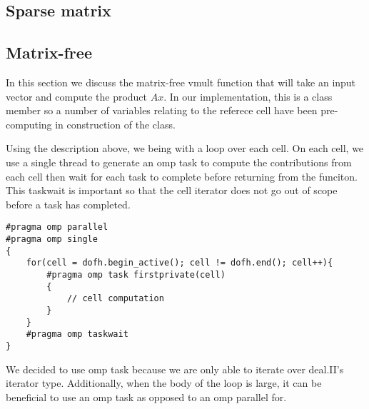 \documentclass[12pt]{article}
\begin{document}
\subsection{Sparse matrix}

\subsection{Matrix-free}
In this section we discuss the matrix-free vmult function that will take an input vector and compute the product $Ax$. In our implementation, this is a class member so a number of variables relating to the referece cell have been pre-computing in construction of the class.

Using the description above, we being with a loop over each cell. On each cell, we use a single thread to generate an omp task to compute the contributions from each cell then wait for each task to complete before returning from the funciton. This taskwait is important so that the cell iterator does not go out of scope before a task has completed. 
\begin{lstlisting}
#pragma omp parallel
#pragma omp single
{
  	for(cell = dofh.begin_active(); cell != dofh.end(); cell++){
		#pragma omp task firstprivate(cell)
		{
			// cell computation
		}
	}
	#pragma omp taskwait
}            
\end{lstlisting}

We decided to use omp task because we are only able to iterate over deal.II's iterator type. Additionally, when the body of the loop is large, it can be beneficial to use an omp task as opposed to an omp parallel for. 
\end{document}
